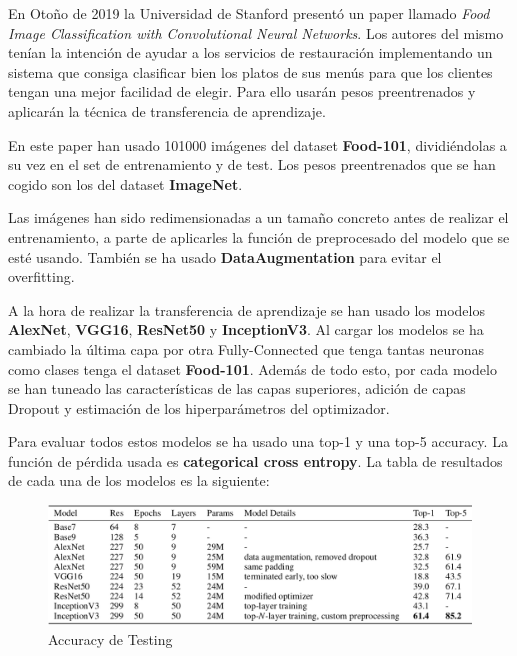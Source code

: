 \newpage

En Otoño de 2019 la Universidad de Stanford presentó un paper llamado \textit{Food Image Classification with Convolutional Neural Networks}. Los autores del mismo tenían la intención de ayudar a los servicios de restauración implementando un sistema que consiga clasificar bien los platos de sus menús para que los clientes tengan una mejor facilidad de elegir. Para ello usarán pesos preentrenados y aplicarán la técnica de transferencia de aprendizaje.

\vspace{3 mm}

En este paper han usado 101000 imágenes del dataset \textbf{Food-101}, dividiéndolas a su vez en el set de entrenamiento y de test. Los pesos preentrenados que se han cogido son los del dataset \textbf{ImageNet}.

\vspace{3 mm}

Las imágenes han sido redimensionadas a un tamaño concreto antes de realizar el entrenamiento, a parte de aplicarles la función de preprocesado del modelo que se esté usando. También se ha usado \textbf{DataAugmentation} para evitar el overfitting.

\vspace{3 mm}

A la hora de realizar la transferencia de aprendizaje se han usado los modelos \textbf{AlexNet}, \textbf{VGG16}, \textbf{ResNet50} y \textbf{InceptionV3}. Al cargar los modelos se ha cambiado la última capa por otra Fully-Connected que tenga tantas neuronas como clases tenga el dataset \textbf{Food-101}. Además de todo esto, por cada modelo se han tuneado las características de las capas superiores, adición de capas Dropout y estimación de los hiperparámetros del optimizador.

\vspace{3 mm}

Para evaluar todos estos modelos se ha usado una top-1 y una top-5 accuracy. La función de pérdida usada es \textbf{categorical cross entropy}. La tabla de resultados de cada una de los modelos es la siguiente:

\vspace{5 mm}

\begin{figure}[H]
  \centering
  \includegraphics[width=1\linewidth]{Imagenes/tablapaper3.png}
  \caption{Accuracy de Testing}
  \label{fig:sub-first}
\end{figure}

